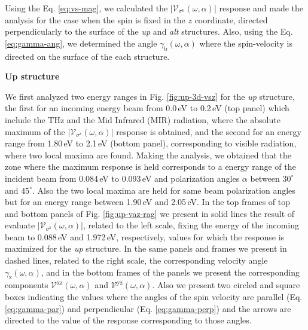 \documentclass[prb,11pt,tightenlines,twocolumn,aps]{revtex4-1}
\begin{document}

{\color{red} Using the Eq. \eqref{eq:vs-mag}, we calculated the
$|\mathcal{V}_{\sigma^{\mathrm{b}}}(\omega,\alpha)|$ response and made the
analysis for the case when the spin is fixed in the $z$ coordinate, directed
perpendicularly to the surface of the \emph{up} and \emph{alt} structures.
Also, using the Eq. \eqref{eq:gamma-ang}, we determined the angle
$\gamma_{\mathrm{b}}(\omega,\alpha)$ where the spin-velocity is directed on the
surface of the each structure.}
% 

\textbf{Up structure}

We first analyzed two energy ranges in Fig. \ref{fig:up-3d-vsz} for the
\emph{up} structure, the first for an incoming energy beam from 0.0\,eV to
0.2\,eV (top panel)  which include the THz and the Mid Infrared (MIR)
radiation, where the absolute maximum of the
$|\mathcal{V}_{\sigma^{\mathrm{z}}}(\omega,\alpha)|$ response is obtained, and
the second for an energy range from 1.80\,eV to 2.1\,eV (bottom panel),
corresponding to visible radiation, where two local maxima are found.
% 
Making the analysis, we obtained that the zone where the maximum response is
held corresponds to a energy range of the incident beam from 0.084\,eV to
0.093\,eV and polarization angles $\alpha$ between $30^{\circ}$ and
$45^{\circ}$. Also the two local maxima are held for same beam polarization
angles but for an energy range between 1.90\,eV and 2.05\,eV. In the top frames
of top and bottom panels of Fig. \ref{fig:up-vaz-rag} we present in solid lines
the result of evaluate $|\mathcal{V}_{\sigma^{\mathrm{z}}}(\omega,\alpha)|$,
related to the left scale, fixing the energy of the incoming beam to 0.088\,eV
and 1.972\,eV, respectively, values for which the response is maximized for the
\emph{up} structure. In the same panels and frames we present in dashed lines,
related to the right scale, the corresponding velocity angle
$\gamma_{\mathrm{z}}(\omega,\alpha)$, and in the bottom frames of the panels we
present the corresponding components $\mathcal{V}^{\mathrm{xz}}(\omega,\alpha)$
and $\mathcal{V}^{\mathrm{yz}}(\omega,\alpha)$. Also we present two circled and
square boxes indicating the values where the angles of the spin velocity are
parallel (Eq. \ref{eq:gamma-par}) and perpendicular (Eq. \ref{eq:gamma-perp})
and the arrows are directed to the value of the response corresponding to those
angles.
\end{document}
